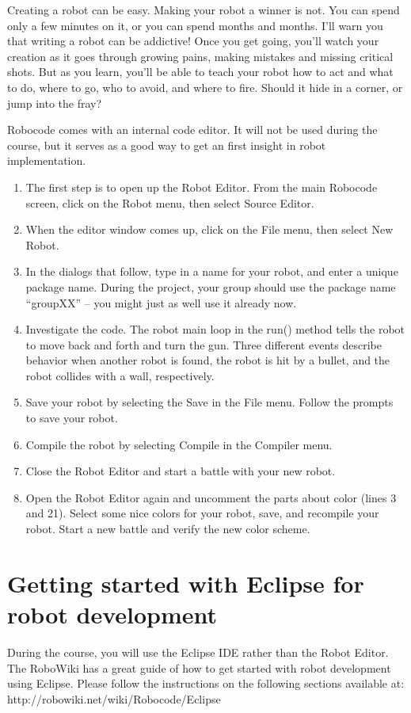 \documentclass{scrreprt}
\begin{document}
Creating a robot can be easy. Making your robot a winner is not. You can spend only a few minutes on it, or you can spend months and months. I'll warn you that writing a robot can be addictive! Once you get going, you'll watch your creation as it goes through growing pains, making mistakes and missing critical shots. But as you learn, you'll be able to teach your robot how to act and what to do, where to go, who to avoid, and where to fire. Should it hide in a corner, or jump into the fray?

Robocode comes with an internal code editor. It will not be used during the course, but it serves as a good way to get an first insight in robot implementation.

\begin{enumerate}
\item The first step is to open up the Robot Editor. From the main Robocode screen, click on the Robot menu, then select Source Editor.
\item When the editor window comes up, click on the File menu, then select New Robot. 
\item In the dialogs that follow, type in a name for your robot, and enter a unique package name. During the project, your group should use the package name ``groupXX'' -- you might just as well use it already now.
\item Investigate the code. The robot main loop in the run() method tells the robot to move back and forth and turn the gun. Three different events describe behavior when another robot is found, the robot is hit by a bullet, and the robot collides with a wall, respectively.
\item Save your robot by selecting the Save in the File menu. Follow the prompts to save your robot. 
\item Compile the robot by selecting Compile in the Compiler menu.
\item Close the Robot Editor and start a battle with your new robot.
\item Open the Robot Editor again and uncomment the parts about color (lines 3 and 21). Select some nice colors for your robot, save, and recompile your robot. Start a new battle and verify the new color scheme. 
\end{enumerate}

\section{Getting started with Eclipse for robot development} \label{sec:eclipse}
During the course, you will use the Eclipse IDE rather than the Robot Editor. The RoboWiki has a great guide of how to get started with robot development using Eclipse. Please follow the instructions on the following sections available at:\\http://robowiki.net/wiki/Robocode/Eclipse
\end{document}
